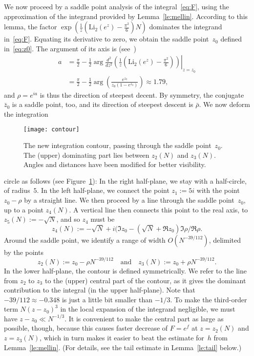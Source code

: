 \documentclass[a4paper]{amsart}
\begin{document}
We now proceed by a saddle point analysis of the integral~\eqref{eq:F},
using the approximation of the integrand provided by Lemma~\ref{le:mellin}.
According to this lemma, the factor
$ \exp\left(  \frac1z
  \left( \mathrm{Li}_2(e^z) - \frac{\pi^2}{6}\right) N \right)$
dominates the integrand in~\eqref{eq:F}. Equating its derivative to zero,
we obtain the saddle point~$z_0$ defined in~\eqref{eq:z0}. The argument
of its axis is (see~\cite{deBr58})
\begin{align*}
   a &= \frac{ \pi}{2} - \frac12 \arg \frac{d^2}{dz^2} \left.\left(
    \frac1z  \left( \mathrm{Li}_2(e^z) - \frac{\pi^2}{6}\right)\right)
    \right|_{z=z_0} \\
   &=  \frac{ \pi}{2} - \frac12 \arg\left( \frac{e^{z_0}}{z_0(1-e^{z_0})} \right) \approx 1.79,
\end{align*}
and $\rho=e^{ia}$ is thus the direction of steepest decent. By symmetry, the conjugate
$\bar{z}_0$ is a saddle point, too, and its direction of steepest descent is $\bar{\rho}$.
We now deform the integration
%
\begin{figure}
\begin{center}
\texttt{[image: contour]}
\end{center}
\caption{\label{fig:path} The new integration contour, passing through
the saddle point~$z_0$. The (upper) dominating part lies between
$z_2(N)$ and $z_3(N)$. Angles and distances have been modified
for better visibility.}
\end{figure}
%
circle as follows (see Figure~\ref{fig:path}):
In the right half-plane, we stay with a half-circle, of radius~$5$. In the left half-plane,
we connect the point $z_1:=5i$ with the point $ z_0-\rho$ by a straight line. We then proceed by a
line through the saddle point~$z_0$,
up to a point $z_4(N)$. A vertical line then connects this point to the real
axis, to $z_5(N):=-\sqrt{N}$, and so $z_4$ must be
\[
  z_4(N) := -\sqrt{N} + i (\Im z_0-(\sqrt{N}+\Re z_0) \Im \rho / \Re \rho.
\]
Around the saddle point, we identify a range of width $O(N^{-39/112})$,
delimited by the points
\[
  z_2(N):=z_0-\rho N^{-39/112} \quad \text{and} \quad
  z_3(N):=z_0+\rho N^{-39/112}.
\]
In the lower half-plane, the contour is defined symmetrically.
We refer to the line from $z_2$ to $z_3$ to the (upper) central part
of the contour, as it gives the dominant contribution to the
integral (in the upper half-plane).
Note that $-39/112\approx -0.348$ is just a little bit smaller than $-1/3$.
To make the third-order term $N(z-z_0)^3$ in the local expansion of the integrand
negligible, we must have $z-z_0 \ll N^{-1/3}$. It is convenient
to make the central part as large as possible, though, because
this causes faster decrease of $F=e^f$ at $z=z_2(N)$
and $z=z_3(N)$, which
in turn makes it easier to beat the estimate for~$h$ from Lemma~\ref{le:mellin}.
(For details, see the tail estimate in Lemma~\ref{le:tail} below.)
\end{document}
